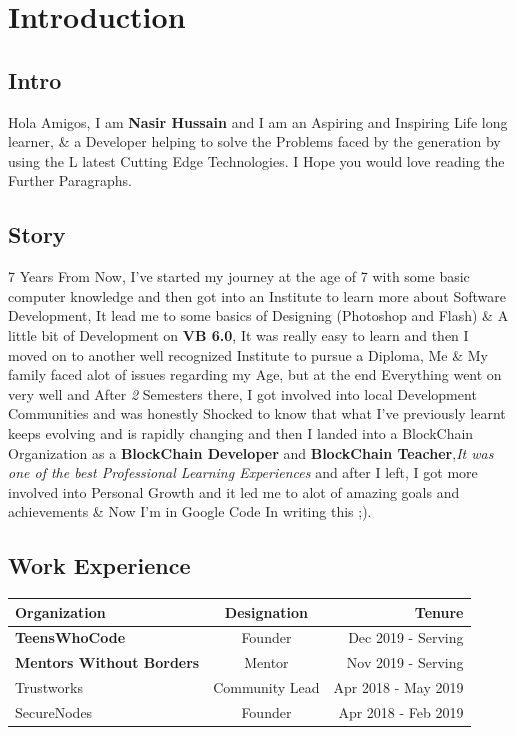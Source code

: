 \documentclass[12pt]{article}
\begin{document}
\section{Introduction}

\subsection{Intro}
Hola Amigos, I am \textbf{Nasir Hussain} and I am an Aspiring and Inspiring Life long learner, \& a Developer helping to solve the Problems faced by the generation by using the L
latest Cutting Edge Technologies. I Hope you would love reading the Further Paragraphs.

\subsection{Story}
7 Years From Now, I've started my journey at the age of 7 with some basic computer knowledge and then got into an Institute to learn more about Software Development, It lead me to some basics of Designing (Photoshop and Flash) \& A little bit of Development on \textbf{VB 6.0}, It was really easy to learn and then I moved on to another well recognized Institute to pursue a Diploma, Me \& My family faced alot of issues regarding my Age, but at the end Everything went on very well and After \emph{2} Semesters there, I got involved into local Development Communities and was honestly Shocked to know that what I've previously learnt keeps evolving and is rapidly changing and then I landed into a BlockChain Organization as a \textbf{BlockChain Developer} and \textbf{BlockChain Teacher},\textit{It was one of the best Professional Learning Experiences} and after I left, I got more involved into Personal Growth and it led me to alot of amazing goals and achievements \& Now I'm in Google Code In writing this ;).

\subsection{Work Experience}

\begin{tabular}{|lcr||}
\textbf{Organization} & \textbf{Designation} & \textbf{Tenure} \\
\hline
\rowcolor{myYellow}
\textbf{TeensWhoCode} & Founder & Dec 2019 - Serving \\
\rowcolor{lightYellow}
\textbf{Mentors Without Borders} & Mentor & Nov 2019 - Serving\\
\rowcolor{myRed}
Trustworks & Community Lead & Apr 2018 - May 2019 \\
\rowcolor{myRed}
SecureNodes & Founder & Apr 2018 - Feb 2019 \\
\end{tabular}
\end{document}
